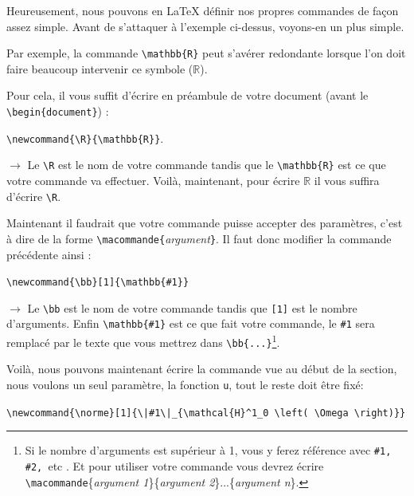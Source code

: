 \documentclass[11pt]{article}				%
\newcommand{\tb}{\textbackslash}
\newcommand{\cmdo}[3][]{\texttt{\textbackslash #2}\texttt{[#1}\texttt{]\{#3\}}}
\newcommand{\cmd}[2]{\texttt{\textbackslash #1}\texttt{\{#2\}}}
\newcommand{\cmdi}[2]{\texttt{\textbackslash #1}\texttt{\{}\textit{#2}\texttt{\}}}
\begin{document}
Heureusement, nous pouvons en LaTeX définir nos propres commandes de façon assez simple. Avant de s'attaquer à l'exemple ci-dessus, voyons-en un plus simple.

Par exemple, la commande \cmd{mathbb}{R} peut s'avérer redondante lorsque l'on doit faire beaucoup intervenir ce symbole ($ \mathbb{R} $).

Pour cela, il vous suffit d'écrire en préambule de votre document (avant le \cmd{begin}{document}) : 
\begin{multicols}{2}

\begin{center}
	\cmd{newcommand\{\tb R\}}{\tb mathbb\{R\}}.
\end{center}
 
\columnbreak

$\rightarrow$ Le \verb|\R| est le nom de votre commande tandis que le \cmd{mathbb}{R} est ce que votre commande va effectuer. Voilà, maintenant, pour écrire $ \mathbb{R} $ il vous suffira d'écrire \verb|\R|.\\
\end{multicols}

Maintenant il faudrait que votre commande puisse accepter des paramètres, c'est à dire de la forme \cmdi{macommande}{argument}. Il faut donc modifier la commande précédente ainsi :

\begin{multicols}{2}
	
	\begin{center}
		\cmdo[1]{newcommand\{\tb bb\}}{\tb mathbb\{\#1\}}
	\end{center}
	
	\columnbreak
	
	$\rightarrow$ Le \verb|\bb| est le nom de votre commande tandis que \verb|[1]| est le nombre d'arguments. Enfin \cmd{mathbb}{\#1} est ce que fait votre commande, le \verb|#1| sera remplacé par le texte que vous mettrez dans \verb|\bb{...}|\footnote{Si le nombre d'arguments est supérieur à 1, vous y ferez référence avec \texttt{\#1, \#2, }etc . Et pour utiliser votre commande vous devrez écrire \texttt{\tb macommande}\{\textit{argument 1}\}\{\textit{argument 2}\}...\{\textit{argument n}\}.}.
\end{multicols}

Voilà, nous pouvons maintenant écrire la commande vue au début de la section, nous voulons un seul paramètre, la fonction \texttt{u}, tout le reste doit être fixé:
\newcommand{\norme}[1]{\|#1\|_{\mathcal{H}^1_0\left(\Omega\right)}}
\begin{center}
	\cmdo[1]{newcommand\{\tb norme\}}{\tb |\#1\tb|{\_}\{\cmd{mathcal}{H}\textasciicircum 1\_0 \tb left( \tb Omega \tb right)\}} \\
\end{center}
\end{document}
